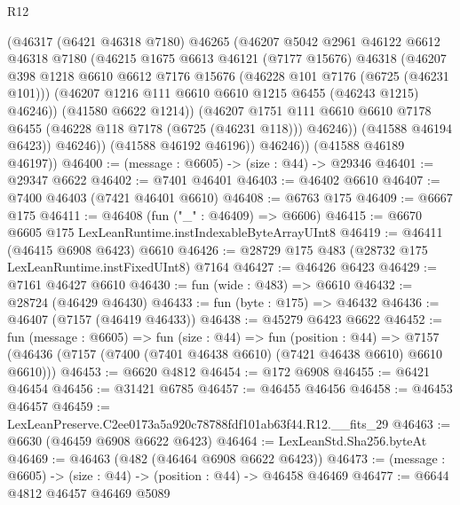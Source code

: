 \begin{lexlean}{R12}
\begin{coremodule}
                (@46317
                  (@6421 @46318 @7180)
                  @46265
                  (@46207
                    @5042
                    @2961
                    @46122
                    @6612
                    @46318
                    @7180
                    (@46215
                      @1675
                      @6613
                      @46121
                      (@7177 @15676)
                      @46318
                      (@46207
                        @398
                        @1218
                        @6610
                        @6612
                        @7176
                        @15676
                        (@46228 @101 @7176 (@6725 (@46231 @101)))
                        (@46207 @1216 @111 @6610 @6610 @1215 @6455 (@46243 @1215) @46246))
                      (@41580 @6622 @1214))
                    (@46207
                      @1751
                      @111
                      @6610
                      @6610
                      @7178
                      @6455
                      (@46228 @118 @7178 (@6725 (@46231 @118)))
                      @46246))
                  (@41588 @46194 @6423))
                @46246))
            (@41588 @46192 @46196))
          @46246))
      (@41588 @46189 @46197))
@46400 := (message : @6605) -> (size : @44) -> @29346
@46401 := @29347 @6622
@46402 := @7401 @46401
@46403 := @46402 @6610
@46407 := @7400 @46403 (@7421 @46401 @6610)
@46408 := @6763 @175
@46409 := @6667 @175
@46411 := @46408 (fun ("_" : @46409) => @6606)
@46415 := @6670 @6605 @175 LexLeanRuntime.instIndexableByteArrayUInt8
@46419 := @46411 (@46415 @6908 @6423) @6610
@46426 := @28729 @175 @483 (@28732 @175 LexLeanRuntime.instFixedUInt8) @7164
@46427 := @46426 @6423
@46429 := @7161 @46427 @6610
@46430 := fun (wide : @483) => @6610
@46432 := @28724 (@46429 @46430)
@46433 := fun (byte : @175) => @46432
@46436 := @46407 (@7157 (@46419 @46433))
@46438 := @45279 @6423 @6622
@46452 := fun (message : @6605) =>
  fun (size : @44) =>
  fun (position : @44) =>
  @7157 (@46436 (@7157 (@7400 (@7401 @46438 @6610) (@7421 @46438 @6610) @6610 @6610)))
@46453 := @6620 @4812
@46454 := @172 @6908
@46455 := @6421 @46454
@46456 := @31421 @6785
@46457 := @46455 @46456
@46458 := @46453 @46457
@46459 := LexLeanPreserve.C2ee0173a5a920c78788fdf101ab63f44.R12.__fits_29
@46463 := @6630 (@46459 @6908 @6622 @6423)
@46464 := LexLeanStd.Sha256.byteAt
@46469 := @46463 (@482 (@46464 @6908 @6622 @6423))
@46473 := (message : @6605) -> (size : @44) -> (position : @44) -> @46458 @46469
@46477 := @6644 @4812 @46457 @46469 @5089

\end{coremodule}
\end{lexlean}
